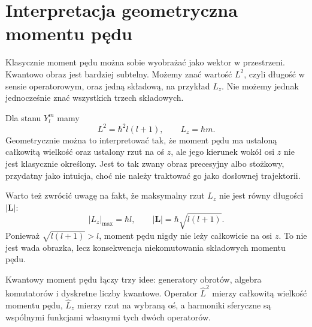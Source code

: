 \section{Interpretacja geometryczna momentu pędu}

Klasycznie moment pędu można sobie wyobrażać jako wektor w przestrzeni. Kwantowo obraz jest bardziej subtelny. Możemy znać wartość \(L^2\), czyli długość w sensie operatorowym, oraz jedną składową, na przykład \(L_z\). Nie możemy jednak jednocześnie znać wszystkich trzech składowych.

Dla stanu \(Y_l^m\) mamy
\[
    L^2=\hbar^2 l(l+1),
    \qquad
    L_z=\hbar m.
\]
Geometrycznie można to interpretować tak, że moment pędu ma ustaloną całkowitą wielkość oraz ustalony rzut na oś \(z\), ale jego kierunek wokół osi \(z\) nie jest klasycznie określony. Jest to tak zwany obraz precesyjny albo stożkowy, przydatny jako intuicja, choć nie należy traktować go jako dosłownej trajektorii.

Warto też zwrócić uwagę na fakt, że maksymalny rzut \(L_z\) nie jest równy długości \(|\mathbf{L}|\):
\[
    |L_z|_{\max}=\hbar l,
    \qquad
    |\mathbf{L}|=\hbar\sqrt{l(l+1)}.
\]
Ponieważ \(\sqrt{l(l+1)}>l\), moment pędu nigdy nie leży całkowicie na osi \(z\). To nie jest wada obrazka, lecz konsekwencja niekomutowania składowych momentu pędu.

\begin{summarybox}
Kwantowy moment pędu łączy trzy idee: generatory obrotów, algebra komutatorów i dyskretne liczby kwantowe. Operator \(\hat{L}^2\) mierzy całkowitą wielkość momentu pędu, \(\hat{L}_z\) mierzy rzut na wybraną oś, a harmoniki sferyczne są wspólnymi funkcjami własnymi tych dwóch operatorów.
\end{summarybox}
